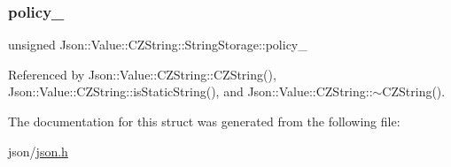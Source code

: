 \mbox{\label{structJson_1_1Value_1_1CZString_1_1StringStorage_a7f68c8d6197c5692a525854b5f29f87b_a7f68c8d6197c5692a525854b5f29f87b}} 
\subsubsection{\texorpdfstring{policy\+\_\+}{policy\_}}
{\footnotesize\ttfamily unsigned Json\+::\+Value\+::\+C\+Z\+String\+::\+String\+Storage\+::policy\+\_\+}



Referenced by Json\+::\+Value\+::\+C\+Z\+String\+::\+C\+Z\+String(), Json\+::\+Value\+::\+C\+Z\+String\+::is\+Static\+String(), and Json\+::\+Value\+::\+C\+Z\+String\+::$\sim$\+C\+Z\+String().



The documentation for this struct was generated from the following file\+:\begin{DoxyCompactItemize}
\item 
json/\hyperlink{json_8h}{json.\+h}\end{DoxyCompactItemize}
